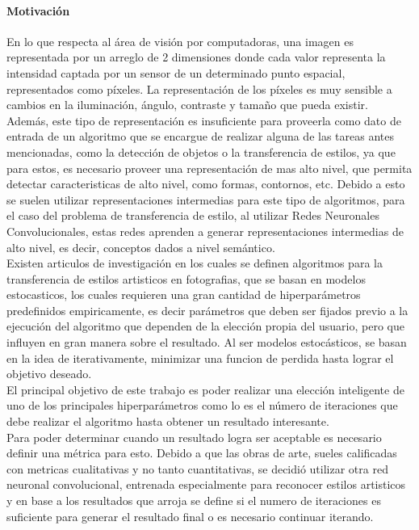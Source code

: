 \documentclass[a4paper,11pt,spanish]{book}
\begin{document}
  \paragraph{Motivación}
    En lo que respecta al área de visión por computadoras, una imagen es representada por un arreglo de 2 dimensiones donde cada valor representa la intensidad captada por un sensor 
    de un determinado punto espacial, representados como píxeles. La representación de los píxeles es muy sensible a cambios en la iluminación, ángulo, contraste y tamaño que pueda existir.\\
    Además, este tipo de representación es insuficiente para proveerla como dato de entrada de un algoritmo que se encargue de realizar alguna de las tareas antes mencionadas, como la
    detección de objetos o la transferencia de estilos, ya que para estos, es necesario proveer una representación de mas alto nivel, que permita detectar caracteristicas de alto nivel,
    como formas, contornos, etc. Debido a esto se suelen utilizar representaciones intermedias para este tipo de algoritmos, para el caso del problema de transferencia de estilo, 
    al utilizar Redes Neuronales Convolucionales, estas redes aprenden a generar representaciones intermedias de alto nivel, es decir, conceptos dados a nivel semántico.\\
    Existen articulos de investigación en los cuales se definen algoritmos para la transferencia de estilos artisticos en fotografias, que se basan en modelos estocasticos, 
    los cuales requieren una gran cantidad de hiperparámetros predefinidos empiricamente, es decir parámetros que deben ser fijados previo a la ejecución del algoritmo que dependen 
    de la elección propia del usuario, pero que influyen en gran manera sobre el resultado. Al ser modelos estocásticos, se basan en la idea de iterativamente, 
    minimizar una funcion de perdida hasta lograr el objetivo deseado. \\
    El principal objetivo de este trabajo es poder realizar una elección inteligente de uno de los principales hiperparámetros como lo es el número de iteraciones 
    que debe realizar el algoritmo hasta obtener un resultado interesante. \\
    Para poder determinar cuando un resultado logra ser aceptable es necesario definir una métrica para esto.
    Debido a que las obras de arte, sueles calificadas con metricas cualitativas y no tanto cuantitativas, se decidió utilizar otra red neuronal convolucional, 
    entrenada especialmente para reconocer estilos artisticos y en base a los resultados que arroja se define si el numero de iteraciones es suficiente para generar el resultado final 
    o es necesario continuar iterando.
  
\end{document}
